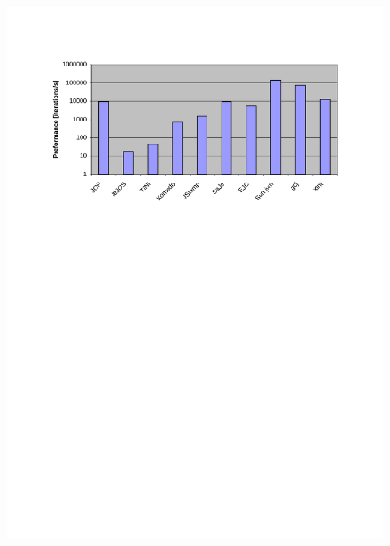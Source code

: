 \begin{figure}
    \centering
    \includegraphics[width=\excelwidth]{results/results_app_bench}
    \\
    \vspace{0.5cm}

\end{figure}
